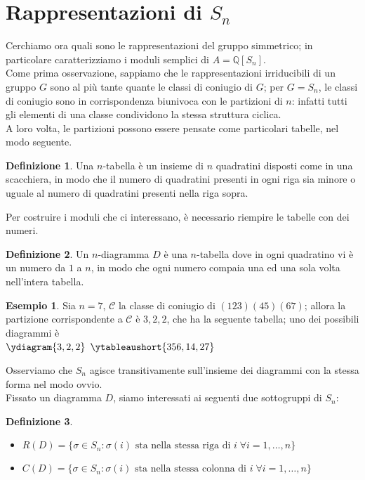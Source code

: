 \documentclass[11pt]{article}
\theoremstyle{plain}
\theoremstyle{definition}
\newtheorem{defn}{Definizione}[section]
\newtheorem{exmp}{Esempio}[section]
\theoremstyle{remark}
\newcommand{\Q}{\mathbb{Q}}
\begin{document}
\section{Rappresentazioni di $S_n$}
Cerchiamo ora quali sono le rappresentazioni del gruppo simmetrico; in particolare caratterizziamo i moduli semplici di $A=\Q[S_n]$.\\
Come prima osservazione, sappiamo che le rappresentazioni irriducibili di un gruppo $G$ sono al più tante quante le classi di coniugio di $G$; per $G=S_n$, le classi di coniugio sono in corrispondenza biunivoca con le partizioni di $n$: infatti tutti gli elementi di una classe condividono la stessa struttura ciclica.\\
A loro volta, le partizioni possono essere pensate come particolari tabelle, nel modo seguente.
\begin{defn}
	Una $n$-tabella è un insieme di $n$ quadratini disposti come in una scacchiera, in modo che il numero di quadratini presenti in ogni riga sia minore o uguale al numero di quadratini presenti nella riga sopra.
\end{defn}
Per costruire i moduli che ci interessano, è necessario riempire le tabelle con dei numeri.
\begin{defn}
	Un $n$-diagramma $D$ è una $n$-tabella dove in ogni quadratino vi è un numero da $1$ a $n$, in modo che ogni numero compaia una ed una sola volta nell'intera tabella.
\end{defn}
\begin{exmp}
	Sia $n=7$, $\mathcal{C}$ la classe di coniugio di $(123)(45)(67)$; allora la partizione corrispondente a $\mathcal{C}$ è $3,2,2$, che ha la seguente tabella; uno dei possibili diagrammi è \\ $\ydiagram{3,2,2}$ $\ytableaushort{356,14,27}$
\end{exmp}
Osserviamo che $S_n$ agisce transitivamente sull'insieme dei diagrammi con la stessa forma nel modo ovvio.\\
Fissato un diagramma $D$, siamo interessati ai seguenti due sottogruppi di $S_n$:
\begin{defn}$ $
	\begin{itemize}
		\item $R(D)=\{\sigma\in S_n : \sigma(i) \text{ sta nella stessa riga di } i\;\forall i=1,\dots,n\}$
		\item $C(D)=\{\sigma\in S_n : \sigma(i) \text{ sta nella stessa colonna di } i\;\forall i=1,\dots,n\}$
	\end{itemize}
\end{defn}
\end{document}
